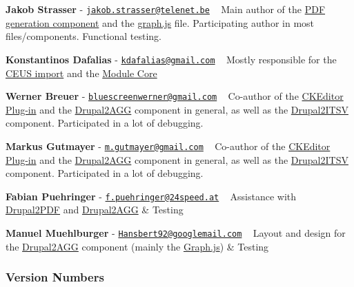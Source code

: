 \begin{DoxyItemize}
\item {\bfseries Jakob Strasser} -\/ \href{mailto:jakob.strasser@telenet.be}{\tt jakob.\+strasser@telenet.\+be} ~\newline
Main author of the \hyperlink{index_CEUS2Drupal}{P\+D\+F generation component} and the \hyperlink{graph_8js}{graph.\+js} file. Participating author in most files/components. Functional testing. 


\item {\bfseries Konstantinos Dafalias} -\/ \href{mailto:kdafalias@gmail.com}{\tt kdafalias@gmail.\+com} ~\newline
Mostly responsible for the \hyperlink{index_CEUS2Drupal}{C\+E\+U\+S import} and the \hyperlink{group___stukowin___module}{Module Core} 


\item {\bfseries Werner Breuer} -\/ \href{mailto:bluescreenwerner@gmail.com}{\tt bluescreenwerner@gmail.\+com} ~\newline
Co-\/author of the \hyperlink{index_plugin}{C\+K\+Editor Plug-\/in} and the \hyperlink{index_Drupal2AGG}{Drupal2\+A\+G\+G} component in general, as well as the \hyperlink{index_Drupal2ITSV}{Drupal2\+I\+T\+S\+V} component. Participated in a lot of debugging. 


\item {\bfseries Markus Gutmayer} -\/ \href{mailto:m.gutmayer@gmail.com}{\tt m.\+gutmayer@gmail.\+com} ~\newline
Co-\/author of the \hyperlink{index_plugin}{C\+K\+Editor Plug-\/in} and the \hyperlink{index_Drupal2AGG}{Drupal2\+A\+G\+G} component in general, as well as the \hyperlink{index_Drupal2ITSV}{Drupal2\+I\+T\+S\+V} component. Participated in a lot of debugging. 


\item {\bfseries Fabian Puehringer} -\/ \href{mailto:f.puehringer@24speed.at}{\tt f.\+puehringer@24speed.\+at} ~\newline
Assistance with \hyperlink{index_Drupal2PDF}{Drupal2\+P\+D\+F} and \hyperlink{index_Drupal2AGG}{Drupal2\+A\+G\+G} \& Testing 


\item {\bfseries Manuel Muehlburger} -\/ \href{mailto:Hansbert92@googlemail.com}{\tt Hansbert92@googlemail.\+com} ~\newline
Layout and design for the \hyperlink{index_Drupal2AGG}{Drupal2\+A\+G\+G} component (mainly the \hyperlink{index_graph}{Graph.\+js}) \& Testing
\end{DoxyItemize}\hypertarget{index_versionnumbers}{}\subsubsection{Version Numbers}\label{index_versionnumbers}
